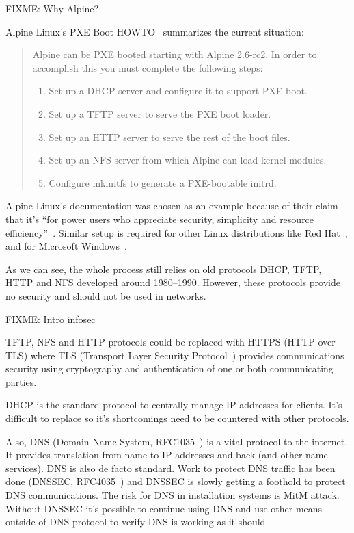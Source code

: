 FIXME: Why Alpine?

Alpine Linux's PXE Boot HOWTO~\cite{alpine-pxe-boot-howto} summarizes
the current situation:

\begin{quote}
Alpine can be PXE booted starting with Alpine 2.6-rc2. In order to
accomplish this you must complete the following steps:

\begin{enumerate}
\item Set up a DHCP server and configure it to support PXE boot.
\item Set up a TFTP server to serve the PXE boot loader.
\item Set up an HTTP server to serve the rest of the boot files.
\item Set up an NFS server from which Alpine can load kernel modules.
\item Configure mkinitfs to generate a PXE-bootable initrd.
\end{enumerate}
\end{quote}

Alpine Linux's documentation was chosen as an example because of their
claim that it's ``for power users who appreciate security, simplicity
and resource efficiency''~\cite{alpine-about}. Similar setup is
required for other Linux distributions like Red
Hat~\cite{redhat-network-install}, and for Microsoft
Windows~\cite{windows-network-install}.

As we can see, the whole process still relies on old protocols DHCP,
TFTP, HTTP and NFS developed around 1980--1990. However, these
protocols provide no security and should not be used in networks.

FIXME: Intro infosec

TFTP, NFS and HTTP protocols could be replaced with HTTPS (HTTP over
TLS) where TLS (Transport Layer Security Protocol~\cite{RFC5246})
provides communications security using cryptography and authentication
of one or both communicating parties.

DHCP is the standard protocol to centrally manage IP addresses for
clients. It's difficult to replace so it's shortcomings need to be
countered with other protocols.

Also, DNS (Domain Name System, RFC1035~\cite{rfc1035}) is a vital
protocol to the internet. It provides translation from name to IP
addresses and back (and other name services). DNS is also de facto
standard. Work to protect DNS traffic has been done (DNSSEC,
RFC4035~\cite{rfc4035}) and DNSSEC is slowly getting a foothold to
protect DNS communications. The risk for DNS in installation systems
is MitM attack. Without DNSSEC it's possible to continue using DNS and
use other means outside of DNS protocol to verify DNS is working as it
should.

